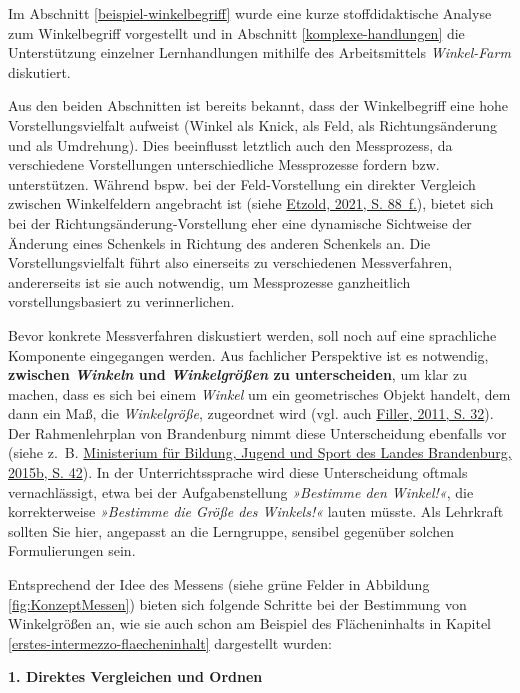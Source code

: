 \documentclass[
]{scrbook}
\theoremstyle{definition}
\theoremstyle{definition}
\theoremstyle{definition}
\theoremstyle{definition}
\theoremstyle{remark}
\begin{document}
Im Abschnitt \ref{beispiel-winkelbegriff} wurde eine kurze stoffdidaktische Analyse zum Winkelbegriff vorgestellt und in Abschnitt \ref{komplexe-handlungen} die Unterstützung einzelner Lernhandlungen mithilfe des Arbeitsmittels \emph{Winkel-Farm} diskutiert.

Aus den beiden Abschnitten ist bereits bekannt, dass der Winkelbegriff eine hohe Vorstellungsvielfalt aufweist (Winkel als Knick, als Feld, als Richtungsänderung und als Umdrehung). Dies beeinflusst letztlich auch den Messprozess, da verschiedene Vorstellungen unterschiedliche Messprozesse fordern bzw. unterstützen. Während bspw. bei der Feld-Vorstellung ein direkter Vergleich zwischen Winkelfeldern angebracht ist (siehe \protect\hyperlink{ref-Etzold2021}{Etzold, 2021, S. 88~f.}), bietet sich bei der Richtungsänderung-Vorstellung eher eine dynamische Sichtweise der Änderung eines Schenkels in Richtung des anderen Schenkels an. Die Vorstellungsvielfalt führt also einerseits zu verschiedenen Messverfahren, andererseits ist sie auch notwendig, um Messprozesse ganzheitlich vorstellungsbasiert zu verinnerlichen.

Bevor konkrete Messverfahren diskustiert werden, soll noch auf eine sprachliche Komponente eingegangen werden. Aus fachlicher Perspektive ist es notwendig, \textbf{zwischen \emph{Winkeln} und \emph{Winkelgrößen} zu unterscheiden}, um klar zu machen, dass es sich bei einem \emph{Winkel} um ein geometrisches Objekt handelt, dem dann ein Maß, die \emph{Winkelgröße}, zugeordnet wird (vgl. auch \protect\hyperlink{ref-Filler2011}{Filler, 2011, S. 32}). Der Rahmenlehrplan von Brandenburg nimmt diese Unterscheidung ebenfalls vor (siehe z.~B. \protect\hyperlink{ref-MinisteriumfurBildungJugendundSportdesLandesBrandenburg2015a}{Ministerium für Bildung, Jugend und Sport des Landes Brandenburg, 2015b, S. 42}). In der Unterrichtssprache wird diese Unterscheidung oftmals vernachlässigt, etwa bei der Aufgabenstellung \emph{»Bestimme den Winkel!«}, die korrekterweise \emph{»Bestimme die Größe des Winkels!«} lauten müsste. Als Lehrkraft sollten Sie hier, angepasst an die Lerngruppe, sensibel gegenüber solchen Formulierungen sein.

Entsprechend der Idee des Messens (siehe grüne Felder in Abbildung \ref{fig:KonzeptMessen}) bieten sich folgende Schritte bei der Bestimmung von Winkelgrößen an, wie sie auch schon am Beispiel des Flächeninhalts in Kapitel \ref{erstes-intermezzo-flaecheninhalt} dargestellt wurden:

\textbf{1. Direktes Vergleichen und Ordnen}
\end{document}
